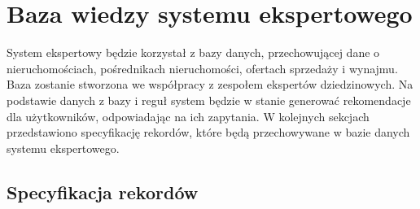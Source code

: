 \section{Baza wiedzy systemu ekspertowego}


System ekspertowy będzie korzystał z bazy danych, przechowującej dane o nieruchomościach, pośrednikach nieruchomości, ofertach sprzedaży i wynajmu. Baza zostanie stworzona we współpracy z zespołem ekspertów dziedzinowych. Na podstawie danych z bazy i reguł system będzie w stanie generować rekomendacje dla użytkowników, odpowiadając na ich zapytania. W kolejnych sekcjach przedstawiono specyfikację rekordów, które będą przechowywane w bazie danych systemu ekspertowego.

\subsection{Specyfikacja rekordów}

